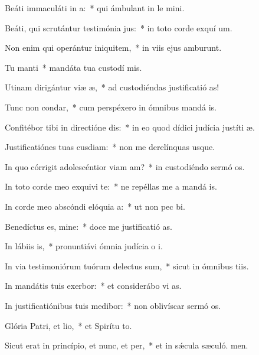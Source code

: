 \item Beáti immaculáti in a:~* qui ámbulant in le mini.
\item Beáti, qui scrutántur testimónia jus:~* in toto corde exquí um.
\item Non enim qui operántur iniquitem,~* in viis ejus amburunt.
\item Tu manti~* mandáta tua custodí mis.
\item Utinam dirigántur viæ æ,~* ad custodiéndas justificatió as!
\item Tunc non condar,~* cum perspéxero in ómnibus mandá is.
\item Confitébor tibi in directióne dis:~* in eo quod dídici judícia justíti æ.
\item Justificatiónes tuas cusdiam:~* non me derelínquas usque.
\item In quo córrigit adolescéntior viam am?~* in custodiéndo sermó os.
\item In toto corde meo exquivi te:~* ne repéllas me a mandá is.
\item In corde meo abscóndi elóquia a:~* ut non pec bi.
\item Benedíctus es, mine:~* doce me justificatió as.
\item In lábiis is,~* pronuntiávi ómnia judícia o i.
\item In via testimoniórum tuórum delectus sum,~* sicut in ómnibus tiis.
\item In mandátis tuis exerbor:~* et considerábo vi as.
\item In justificatiónibus tuis medibor:~* non oblivíscar sermó os.
\item Glória Patri, et lio,~* et Spirítu to.
\item Sicut erat in princípio, et nunc, et per,~* et in sǽcula sæculó. men.
